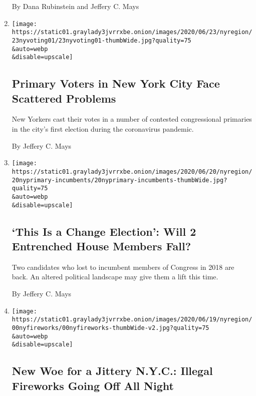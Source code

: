 \begin{enumerate}
  By Dana Rubinstein and Jeffery C. Mays
\item
  \href{/2020/06/23/nyregion/voting-nyc-primary.html}{}

  \texttt{[image: https://static01.graylady3jvrrxbe.onion/images/2020/06/23/nyregion/23nyvoting01/23nyvoting01-thumbWide.jpg?quality=75\\\&auto=webp\\\&disable=upscale]}

  \hypertarget{primary-voters-in-new-york-city-face-scattered-problems}{%
  \subsection{Primary Voters in New York City Face Scattered
  Problems}\label{primary-voters-in-new-york-city-face-scattered-problems}}

  New Yorkers cast their votes in a number of contested congressional
  primaries in the city's first election during the coronavirus
  pandemic.

  By Jeffery C. Mays
\item
  \href{/2020/06/20/nyregion/house-primaries-clarke-maloney-ny.html}{}

  \texttt{[image: https://static01.graylady3jvrrxbe.onion/images/2020/06/20/nyregion/20nyprimary-incumbents/20nyprimary-incumbents-thumbWide.jpg?quality=75\\\&auto=webp\\\&disable=upscale]}

  \hypertarget{this-is-a-change-election-will-2-entrenched-house-members-fall}{%
  \subsection{`This Is a Change Election': Will 2 Entrenched House
  Members
  Fall?}\label{this-is-a-change-election-will-2-entrenched-house-members-fall}}

  Two candidates who lost to incumbent members of Congress in 2018 are
  back. An altered political landscape may give them a lift this time.

  By Jeffery C. Mays
\item
  \href{/2020/06/19/nyregion/fireworks-every-night-nyc.html}{}

  \texttt{[image: https://static01.graylady3jvrrxbe.onion/images/2020/06/19/nyregion/00nyfireworks/00nyfireworks-thumbWide-v2.jpg?quality=75\\\&auto=webp\\\&disable=upscale]}

  \hypertarget{new-woe-for-a-jittery-nyc-illegal-fireworks-going-off-all-night}{%
  \subsection{New Woe for a Jittery N.Y.C.: Illegal Fireworks Going Off
  All
  Night}\label{new-woe-for-a-jittery-nyc-illegal-fireworks-going-off-all-night}}


\end{enumerate}

